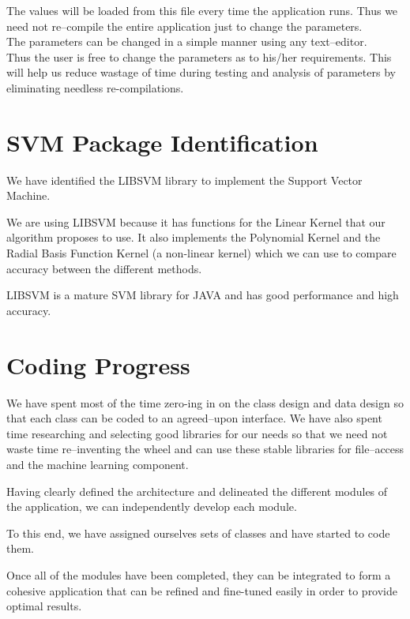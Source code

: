 \documentclass[10pt,a4paper]{report}
\begin{document}
The values will be loaded from this file every time the application runs. Thus we need not re--compile the entire application just to change the parameters. \\

The parameters can be changed in a simple manner using any text--editor. \\

Thus the user is free to change the parameters as to his/her requirements. 
This will help us reduce wastage of time during testing and analysis of parameters by eliminating needless re-compilations.



\section{SVM Package Identification}

We have identified the LIBSVM\cite{libsvm} library to implement the Support Vector Machine.

We are using LIBSVM because it has functions for the Linear Kernel\cite{libsvmpaper} that our algorithm proposes to use. It also implements the Polynomial Kernel and the Radial Basis Function Kernel (a non-linear kernel) which we can use to compare accuracy between the different methods.

LIBSVM is a mature SVM library for JAVA and has good performance and high accuracy\cite{libsvmpaper}.

\section{Coding Progress}

We have spent most of the time zero-ing in on the class design and data design so that each class can be coded to an agreed--upon interface. 
We have also spent time researching and selecting good libraries for our needs so that we need not waste time re--inventing the wheel and can use these stable libraries for file--access and the machine learning component.

Having clearly defined the architecture and delineated the different modules of the application, we can independently develop each module. 

To this end, we have assigned ourselves sets of classes and have started to code them.  

Once all of the modules have been completed, they can be integrated to form a cohesive application that can be refined and fine-tuned easily in order to provide optimal results. 
\end{document}
